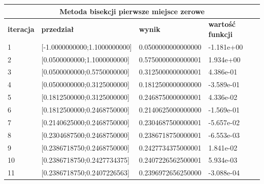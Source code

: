\documentclass[a4paper, 11pt]{article}
\begin{document}
\begin{table}[H]
\centering
\label{my-label}
\begin{tabular}{llll}
\hline
\multicolumn{4}{c}{\textbf{Metoda bisekcji pierwsze miejsce zerowe}} \\ \hline
\multicolumn{1}{|l|}{\textbf{iteracja}} & \multicolumn{1}{l|}{\textbf{przedział}} & \multicolumn{1}{l|}{\textbf{wynik}} & \multicolumn{1}{l|}{\textbf{wartość funkcji}} \\ \hline
\multicolumn{1}{|l|}{1} & \multicolumn{1}{l|}{{[}-1.0000000000;1.1000000000{]}} & \multicolumn{1}{l|}{0.0500000000000000} & \multicolumn{1}{l|}{-1.181e+00} \\ \hline
\multicolumn{1}{|l|}{2} & \multicolumn{1}{l|}{{[}0.0500000000;1.1000000000{]}} & \multicolumn{1}{l|}{0.5750000000000001} & \multicolumn{1}{l|}{1.934e+00} \\ \hline
\multicolumn{1}{|l|}{3} & \multicolumn{1}{l|}{{[}0.0500000000;0.5750000000{]}} & \multicolumn{1}{l|}{0.3125000000000001} & \multicolumn{1}{l|}{4.386e-01} \\ \hline
\multicolumn{1}{|l|}{4} & \multicolumn{1}{l|}{{[}0.0500000000;0.3125000000{]}} & \multicolumn{1}{l|}{0.1812500000000000} & \multicolumn{1}{l|}{-3.589e-01} \\ \hline
\multicolumn{1}{|l|}{5} & \multicolumn{1}{l|}{{[}0.1812500000;0.3125000000{]}} & \multicolumn{1}{l|}{0.2468750000000001} & \multicolumn{1}{l|}{4.336e-02} \\ \hline
\multicolumn{1}{|l|}{6} & \multicolumn{1}{l|}{{[}0.1812500000;0.2468750000{]}} & \multicolumn{1}{l|}{0.2140625000000000} & \multicolumn{1}{l|}{-1.569e-01} \\ \hline
\multicolumn{1}{|l|}{7} & \multicolumn{1}{l|}{{[}0.2140625000;0.2468750000{]}} & \multicolumn{1}{l|}{0.2304687500000001} & \multicolumn{1}{l|}{-5.657e-02} \\ \hline
\multicolumn{1}{|l|}{8} & \multicolumn{1}{l|}{{[}0.2304687500;0.2468750000{]}} & \multicolumn{1}{l|}{0.2386718750000001} & \multicolumn{1}{l|}{-6.553e-03} \\ \hline
\multicolumn{1}{|l|}{9} & \multicolumn{1}{l|}{{[}0.2386718750;0.2468750000{]}} & \multicolumn{1}{l|}{0.2427734375000001} & \multicolumn{1}{l|}{1.841e-02} \\ \hline
\multicolumn{1}{|l|}{10} & \multicolumn{1}{l|}{{[}0.2386718750;0.2427734375{]}} & \multicolumn{1}{l|}{0.2407226562500001} & \multicolumn{1}{l|}{5.934e-03} \\ \hline
\multicolumn{1}{|l|}{11} & \multicolumn{1}{l|}{{[}0.2386718750;0.2407226563{]}} & \multicolumn{1}{l|}{0.2396972656250000} & \multicolumn{1}{l|}{-3.088e-04} \\ \hline

\end{tabular}
\end{table}
\end{document}
